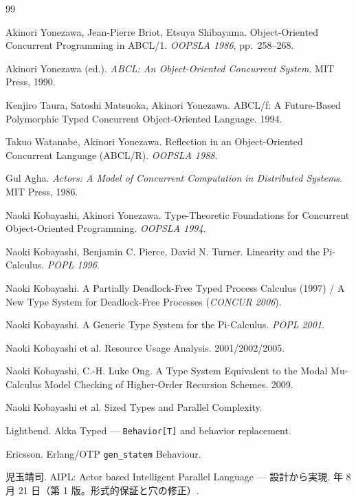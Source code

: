 \documentclass[11pt,a4paper]{ltjsarticle}
\theoremstyle{definition}
\theoremstyle{remark}
\begin{document}
\begin{thebibliography}{99}

Akinori Yonezawa, Jean-Pierre Briot, Etsuya Shibayama.
\newblock Object-Oriented Concurrent Programming in ABCL/1.
\newblock \emph{OOPSLA 1986}, pp.~258--268.

Akinori Yonezawa (ed.).
\newblock \emph{ABCL: An Object-Oriented Concurrent System}. MIT Press, 1990.

Kenjiro Taura, Satoshi Matsuoka, Akinori Yonezawa.
\newblock ABCL/f: A Future-Based Polymorphic Typed Concurrent
Object-Oriented Language. 1994.

Takuo Watanabe, Akinori Yonezawa.
\newblock Reflection in an Object-Oriented Concurrent Language (ABCL/R).
\newblock \emph{OOPSLA 1988}.

Gul Agha.
\newblock \emph{Actors: A Model of Concurrent Computation in Distributed
Systems}. MIT Press, 1986.

Naoki Kobayashi, Akinori Yonezawa.
\newblock Type-Theoretic Foundations for Concurrent Object-Oriented Programming.
\newblock \emph{OOPSLA 1994}.

Naoki Kobayashi, Benjamin C. Pierce, David N. Turner.
\newblock Linearity and the Pi-Calculus. \emph{POPL 1996}.

Naoki Kobayashi.
\newblock A Partially Deadlock-Free Typed Process Calculus (1997) /
A New Type System for Deadlock-Free Processes (\emph{CONCUR 2006}).

Naoki Kobayashi.
\newblock A Generic Type System for the Pi-Calculus. \emph{POPL 2001}.

Naoki Kobayashi et al.
\newblock Resource Usage Analysis. 2001/2002/2005.

Naoki Kobayashi, C.-H. Luke Ong.
\newblock A Type System Equivalent to the Modal Mu-Calculus Model Checking
of Higher-Order Recursion Schemes. 2009.

Naoki Kobayashi et al.
\newblock Sized Types and Parallel Complexity.

Lightbend.
\newblock Akka Typed --- \texttt{Behavior[T]} and behavior replacement.

Ericsson.
\newblock Erlang/OTP \texttt{gen\_statem} Behaviour.

児玉靖司.
\newblock AIPL: Actor based Intelligent Parallel Language --- 設計から実現.
 年 8 月 21 日（第 1 版。形式的保証と穴の修正）.


\end{thebibliography}
\end{document}

